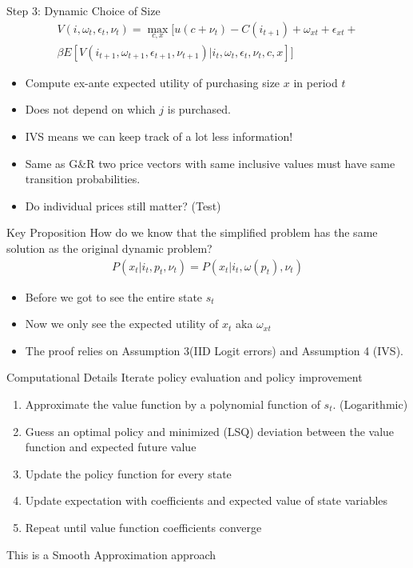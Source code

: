 \documentclass[xcolor=pdftex,dvipsnames,table,mathserif,aspectratio=169]{beamer}
\begin{document}
\begin{frame}{Step 3: Dynamic Choice of Size}
\begin{eqnarray*}
V(i,\omega_t,\epsilon_t,\nu_t) = \max_{c,x} [ u(c + \nu_t) - C(i_{t+1}) + \omega_{xt} + \epsilon_{xt} + \\
\beta E[V(i_{t+1},\omega_{t+1},\epsilon_{t+1},\nu_{t+1}) | i_t, \omega_t, \epsilon_t, \nu_t, c, x] ]
\end{eqnarray*}

\begin{itemize}
\item Compute ex-ante expected utility of purchasing size $x$ in period $t$
\item Does not depend on which $j$ is purchased.
\item IVS means we can keep track of a lot less information!
\item Same as G\&R two price vectors with same inclusive values must have same transition probabilities.
\item Do individual prices still matter? (Test)
\end{itemize}
\end{frame}

\begin{frame}{Key Proposition}
How do we know that the simplified problem has the same solution as the original dynamic problem?
\begin{eqnarray*}
P(x_t | i_t,p_t, \nu_t) = P(x_t | i_t, \omega(p_t),\nu_t)
\end{eqnarray*}

\begin{itemize}
\item Before we got to see the entire state $s_t$
\item Now we only see the expected utility of $x_t$ aka $\omega_{xt}$
\item The proof relies on Assumption 3(IID Logit errors) and Assumption 4 (IVS).
\end{itemize}
\end{frame}

\begin{frame}{Computational Details}
Iterate policy evaluation and policy improvement 
\begin{enumerate}
\item Approximate the value function by a polynomial function of $s_t$. (Logarithmic)
\item Guess an optimal policy and minimized (LSQ) deviation between the value function and expected future value
\item Update the policy function for every state
\item Update expectation with coefficients and expected value of state variables
\item Repeat until value function coefficients converge
\end{enumerate}
This is a \alert{Smooth Approximation} approach
\end{frame}
\end{document}
